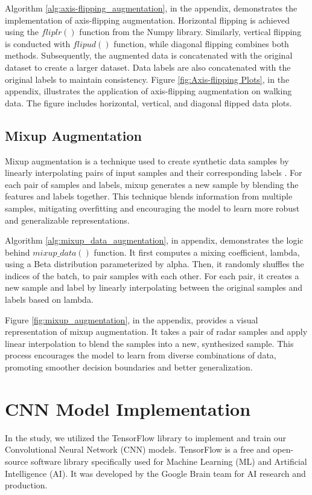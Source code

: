 \documentclass{l4proj}
\begin{document}
Algorithm \ref{alg:axis-flipping_augmentation}, in the appendix, demonstrates the implementation of axis-flipping augmentation. Horizontal flipping is achieved using the $fliplr()$ function from the Numpy library. Similarly, vertical flipping is conducted with $flipud()$ function, while diagonal flipping combines both methods. Subsequently, the augmented data is concatenated with the original dataset to create a larger dataset. Data labels are also concatenated with the original labels to maintain consistency. Figure \ref{fig:Axis-flipping Plots}, in the appendix, illustrates the application of axis-flipping augmentation on walking data. The figure includes horizontal, vertical, and diagonal flipped data plots.

\subsection{Mixup Augmentation}
Mixup augmentation is a technique used to create synthetic data samples by linearly interpolating pairs of input samples and their corresponding labels \citep{mixup_beyond_empirical_risk_minimization}. For each pair of samples and labels, mixup generates a new sample by blending the features and labels together. This technique blends information from multiple samples, mitigating overfitting and encouraging the model to learn more robust and generalizable representations.

Algorithm \ref{alg:mixup_data_augmentation}, in appendix, demonstrates the logic behind $mixup\_data()$ function. It first computes a mixing coefficient, lambda, using a Beta distribution parameterized by alpha. Then, it randomly shuffles the indices of the batch, to pair samples with each other. For each pair, it creates a new sample and label by linearly interpolating between the original samples and labels based on lambda. 

Figure \ref{fig:mixup_augmentation}, in the appendix, provides a visual representation of mixup augmentation. It takes a pair of radar samples and apply linear interpolation to blend the samples into a new, synthesized sample. This process encourages the model to learn from diverse combinations of data, promoting smoother decision boundaries and better generalization.

\section{CNN Model Implementation}
In the study, we utilized the TensorFlow library to implement and train our Convolutional Neural Network (CNN) models. TensorFlow is a free and open-source software library specifically used for Machine Learning (ML) and Artificial Intelligence (AI). It was developed by the Google Brain team for AI research and production.
\end{document}
